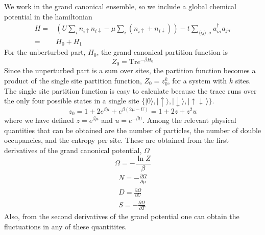 \documentclass[oneside,11pt]{memoir}
\newcommand{\dbl}{\ensuremath{ \uparrow\! \downarrow \, }}
\newcommand{\spup}{\ensuremath{ \uparrow }}
\newcommand{\spdn}{\ensuremath{ \downarrow}}
\begin{document}
We work in the grand canonical ensemble, so we include a global chemical potential
in the hamiltonian
\begin{equation}
\begin{split}
  H = &  
         \left( U\sum_{i} n_{i\spup} n_{i\spdn}  
         - \mu\sum_{i}( n_{i\spup} + n_{i\spdn} ) \right)
-t \sum_{ \langle ij \rangle, \sigma   } 
          a_{i\sigma}^{\dagger}a_{j\sigma} \\
   = &  H_{0} + H_{1} 
\end{split}
\end{equation}
For the unberturbed part, $H_{0}$, the grand canonical partition function is 
\begin{equation}
 Z_{0} = \text{Tr} e^{-\beta H_{0}} 
\end{equation}
Since the unperturbed part is a sum over sites, the partition function becomes
a product of the single site partition function, $Z_{0} = z_{0}^{k}$, for a
system with $k$ sites.  The single site partition function  is easy to
calculate because the trace runs over the only four possible states in a single
site $\lbrace |0\rangle, |\spup\rangle, |\spdn\rangle, |\dbl\rangle\rbrace$.
\begin{equation}
 z_{0} = 1 + 2 e^{\beta\mu} + e^{\beta (2\mu-U)} = 1 + 2z + z^{2}u 
\end{equation}
where we have defined $z=e^{\beta\mu}$ and $u=e^{-\beta U }$.  Among the
relevant physical quantities that can be obtained are the number of particles,
the number of double occupancies, and the entropy per site.  These are obtained
from the first derivatives of the grand canonical potential, $\Omega$
\begin{equation}
  \Omega = - \frac{\ln Z}{\beta}
\end{equation}
\begin{gather}
  N = -\frac{\partial \Omega}{ \partial \mu }\\
  D = \frac{\partial \Omega}{ \partial U }  \\
  S = -\frac{\partial \Omega}{ \partial T} 
\end{gather}
Also, from the second derivatives of the grand potential one can obtain the
fluctuations in any of these quantitites. 
\end{document}
